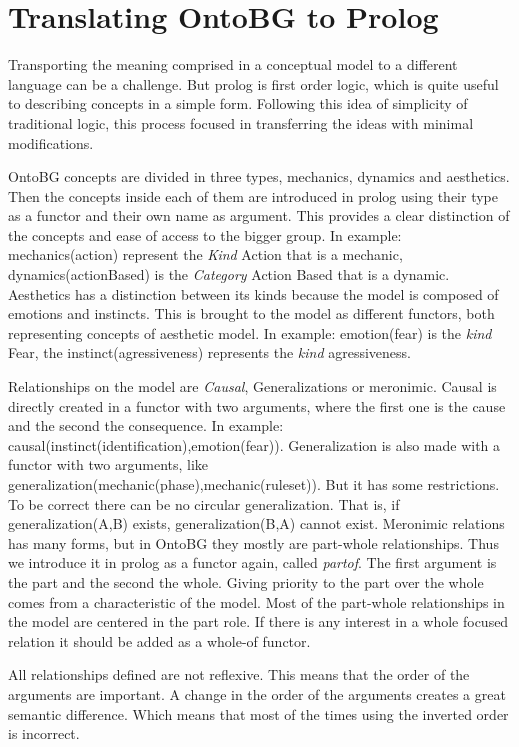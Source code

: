 \section{Translating OntoBG to Prolog}

Transporting the meaning comprised in a conceptual model to a different language can be a challenge. But prolog is first order logic, which is quite useful to describing concepts in a simple form. Following this idea of simplicity of traditional logic, this process focused in transferring the ideas with minimal modifications.

OntoBG concepts are divided in three types, mechanics, dynamics and aesthetics. Then the concepts inside each of them are introduced in prolog using their type as a functor and their own name as argument. This provides a clear distinction of the concepts and ease of access to the bigger group. In example: mechanics(action) represent the \textit{Kind} Action that is a mechanic, dynamics(actionBased) is the \textit{Category} Action Based that is a dynamic. Aesthetics has a distinction between its kinds because the model is composed of emotions and instincts. This is brought to the model as different functors, both representing concepts of aesthetic model. In example: emotion(fear) is the \textit{kind} Fear, the instinct(agressiveness) represents the \textit{kind} agressiveness. 

Relationships on the model are \textit{Causal}, Generalizations or meronimic. Causal is directly created in a functor with two arguments, where the first one is the cause and the second the consequence. In example: causal(instinct(identification),emotion(fear)). Generalization is also made with a functor with two arguments, like generalization(mechanic(phase),mechanic(ruleset)). But it has some restrictions. To be correct there can be no circular generalization. That is, if generalization(A,B) exists, generalization(B,A) cannot exist. Meronimic relations has many forms, but in OntoBG they mostly are part-whole relationships. Thus we introduce it in prolog as a functor again, called \textit{partof}. The first argument is the part and the second the whole. Giving priority to the part over the whole comes from a characteristic of the model. Most of the part-whole relationships in the model are centered in the part role. If there is any interest in a whole focused relation it should be added as a whole-of functor. 

All relationships defined are not reflexive. This means that the order of the arguments are important. A change in the order of the arguments creates a great semantic difference. Which means that most of the times using the inverted order is incorrect. 

